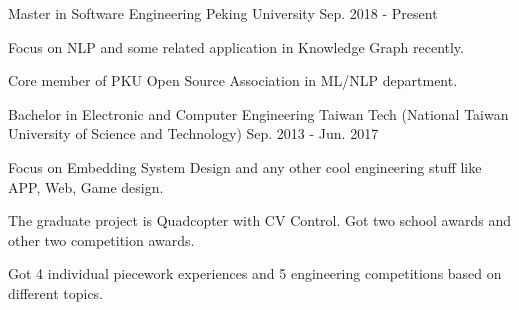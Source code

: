 

\begin{cventries}

  \cventry
    {Master in Software Engineering} %
    {Peking University} %
    {} %
    {Sep. 2018 - Present} %
    {
      \begin{cvitems} %
        \item {Focus on NLP and some related application in Knowledge Graph recently.}
        \item {Core member of PKU Open Source Association in ML/NLP department.}
      \end{cvitems}
    }

  \cventry
    {Bachelor in Electronic and Computer Engineering} %
    {Taiwan Tech (National Taiwan University of Science and Technology)} %
    {} %
    {Sep. 2013 - Jun. 2017} %
    {
      \begin{cvitems} %
        \item {Focus on Embedding System Design and any other cool engineering stuff like APP, Web, Game design.}
        \item {The graduate project is Quadcopter with CV Control. Got two school awards and other two competition awards.}
        \item {Got 4 individual piecework experiences and 5 engineering competitions based on different topics.}
      \end{cvitems}
    }

\end{cventries}

